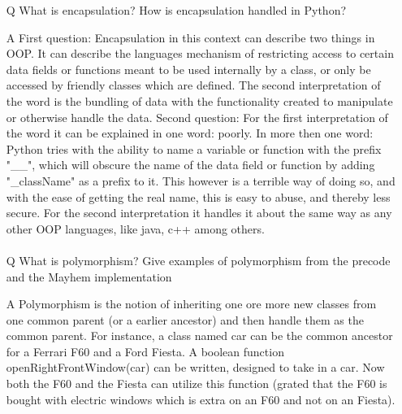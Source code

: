 \documentclass{article}
\begin{document}
\begin{itemize}
\paragraph{}
\item[Q] 
What is encapsulation? How is encapsulation handled in Python?
\item[A]
First question: Encapsulation in this context can describe two things in OOP. It can describe the languages mechanism of restricting access to certain data fields or functions meant to be used internally by a class, or only be accessed by friendly classes which are defined. The second interpretation of the word is the bundling of data with the functionality created to manipulate or otherwise handle the data.
Second question: For the first interpretation of the word it can be explained in one word: poorly. In more then one word: Python tries with the ability to name a variable or function with the prefix "\_\_", which will obscure the name of the data field or function by adding "\_className" as a prefix to it. This however is a terrible way of doing so, and with the ease of getting the real name, this is easy to abuse, and thereby less secure.
 For the second interpretation it handles it about the same way as any other OOP languages, like java, c++ among others.
\paragraph{}
\item[Q]
What is polymorphism? Give examples of polymorphism from the precode and the Mayhem implementation
\item[A]
Polymorphism is the notion of inheriting one ore more new classes from one common parent (or a earlier ancestor) and then handle them as the common parent. For instance, a class named car can be the common ancestor for a Ferrari F60 and a Ford Fiesta. A boolean function openRightFrontWindow(car) can be written, designed to take in a car. Now both the F60 and the Fiesta can utilize this function (grated that the F60 is bought with electric windows which is extra on an F60 and not on an Fiesta).
\end{itemize}
\end{document}
